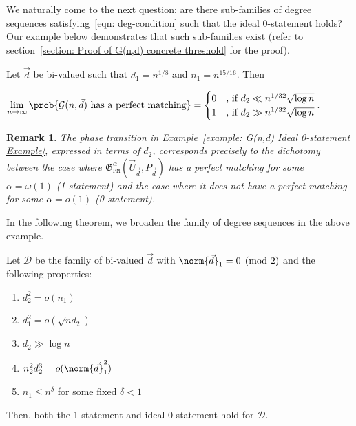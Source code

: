 \documentclass[12pt]{article}
\newtheorem*{remark*}{Remark}
\begin{document}
We naturally come to the next question: are there sub-families of degree sequences satisfying~\eqref{eqn: deg-condition} such that the ideal 0-statement holds? Our example below demonstrates that such sub-families exist (refer to section~\ref{section: Proof of G(n,d) concrete threshold} for the proof). 

\begin{example}
\label{example: G(n,d) Ideal 0-statement Example}
Let $\vec{d}$ be bi-valued such that $d_1 = n^{1/8}$ and $n_1 = n^{15/16}$. Then
\begin{center}
    $\lim\limits_{n\rightarrow\infty}\prob{\mathcal{G}(n,\vec{d}) \text{ has a perfect matching}} = \begin{cases} 0 &\text{, if } d_2\ll n^{1/32}\sqrt{\log n}\\ 1 &\text{, if } d_2\gg n^{1/32}\sqrt{\log n}\end{cases}$.
\end{center}
\end{example}

\begin{remark*}
The phase transition in Example~\ref{example: G(n,d) Ideal 0-statement Example}, expressed in terms of $d_2$, corresponds precisely to the dichotomy between the case where $\mathfrak{G}_{\texttt{PM}}^\alpha(\vec{U}_{\vec{d}},P_{\vec{d}})$ has a perfect matching for some $\alpha = \omega(1)$ (1-statement) and the case where it does not have a perfect matching for some $\alpha = o(1)$ (0-statement).
\end{remark*}

In the following theorem, we broaden the family of degree sequences in the above example. 

\begin{theorem}
\label{theorem: G(n,d) bi-valued 0-statement}
      Let $\mathcal{D}$ be the family of bi-valued $\vec{d}$  with $\norm{\vec{d}}_1=0\pmod{2}$ and the following properties:
      \begin{enumerate}[label=(A\arabic*), leftmargin=3cm]
          \item $d_2^2 = o(n_1)$ \label{cond: d_2 and n_1 bound}
          \item $d_1^2 = o(\sqrt{n d_2})$ \label{cond: stronger d_1 bound}
          \item $d_2\gg\log n$ \label{cond: d_2 lower bound embedding}
          \item $n_2^2 d_2^3 = o(\norm{\vec{d}}_1^2)$ \label{cond: n_2 and d_2 bound with norm}
          \item $n_1\leq n^\delta$ for some fixed $\delta < 1$ \label{cond: n_1 small}
      \end{enumerate}
      Then, both the 1-statement and ideal 0-statement hold for $\mathcal{D}$.
\end{theorem}
\end{document}
